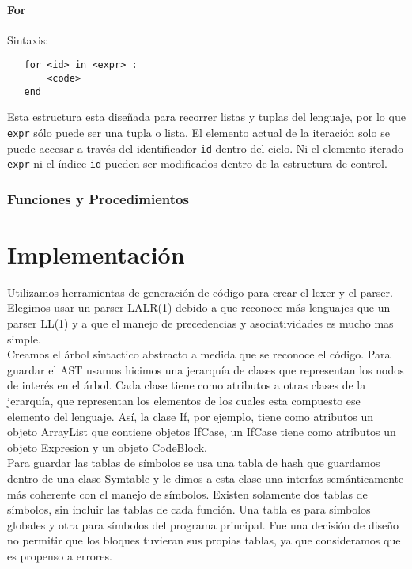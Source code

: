 \documentclass[12pt, spanish]{report}
\begin{document}
\subsubsection{For}
Sintaxis:
\begin{verbatim}
   for <id> in <expr> :
       <code>
   end
\end{verbatim}

Esta estructura esta dise\~nada para recorrer listas y tuplas del
lenguaje, por lo que \texttt{expr} s\'olo puede ser una tupla o lista. El
elemento actual de la iteraci\'on solo se puede accesar a trav\'es del
identificador \texttt{id} dentro del ciclo. Ni el elemento iterado \texttt{expr} ni
el \'indice \texttt{id} pueden ser modificados dentro de la estructura de control.\\

\subsection{Funciones y Procedimientos}
\label{sec:func}

\chapter{Implementaci\'on}
\label{chap:impl}
Utilizamos herramientas de generaci\'on de c\'odigo para crear el lexer y
el parser. Elegimos usar un parser LALR(1) debido a que reconoce m\'as
lenguajes que un parser LL(1) y a que el manejo de precedencias y
asociatividades es mucho mas simple.\\
Creamos el \'arbol sintactico abstracto a medida que se reconoce el
c\'odigo. Para guardar el AST usamos hicimos una jerarqu\'ia
de clases que representan los nodos de inter\'es en el \'arbol. Cada clase
tiene como atributos a otras clases de la jerarqu\'ia, que representan los
elementos de los cuales esta compuesto ese elemento del lenguaje. As\'i,
la clase If, por ejemplo, tiene como atributos un objeto ArrayList que
contiene objetos IfCase, un IfCase tiene como atributos un objeto
Expresion y un objeto CodeBlock.\\
Para guardar las tablas de s\'imbolos se usa una tabla de hash que
guardamos dentro de una clase Symtable y le dimos a esta clase una interfaz
sem\'anticamente m\'as coherente con el manejo de s\'imbolos.
Existen solamente dos tablas de s\'imbolos, sin incluir las tablas de
cada funci\'on. Una tabla es para s\'imbolos globales y otra para
s\'imbolos del programa principal. Fue una decisi\'on de
dise\~no no permitir que los bloques tuvieran sus propias tablas, ya que
consideramos que es propenso a errores.
\end{document}
